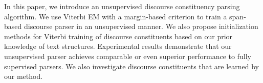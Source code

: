 In this paper, we introduce an unsupervised discourse constituency parsing algorithm. We use Viterbi EM with a margin-based criterion to train a span-based discourse parser in an unsupervised manner. We also propose initialization methods for Viterbi training of discourse constituents based on our prior knowledge of text structures. Experimental results demonstrate that our unsupervised parser achieves comparable or even superior performance to fully supervised parsers. We also investigate discourse constituents that are learned by our method.